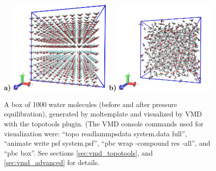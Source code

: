 \documentclass[11pt]{article}
\begin{document}
\begin{figure}[htbp]
\centering
\textbf{a)}
\includegraphics[width=5cm]{waterSPCEx1000_LR.jpg}
\textbf{b)}
\includegraphics[width=5cm]{waterSPCEx1000_t=25_LR.jpg}
\caption{
\label{fig:spce_x_1000}
A box of 1000 water molecules (before and after pressure equilibration), 
generated by moltemplate and visualized by VMD with the topotools plugin.
(The VMD console commands used for visualization were:
``topo readlammpsdata system.data full'',
``animate write psf system.psf'',
``pbc wrap -compound res -all'', and 
``pbc box''.
See sections \ref{sec:vmd_topotools}, and \ref{sec:vmd_advanced}
for details.
}
\end{figure}

\end{document}
